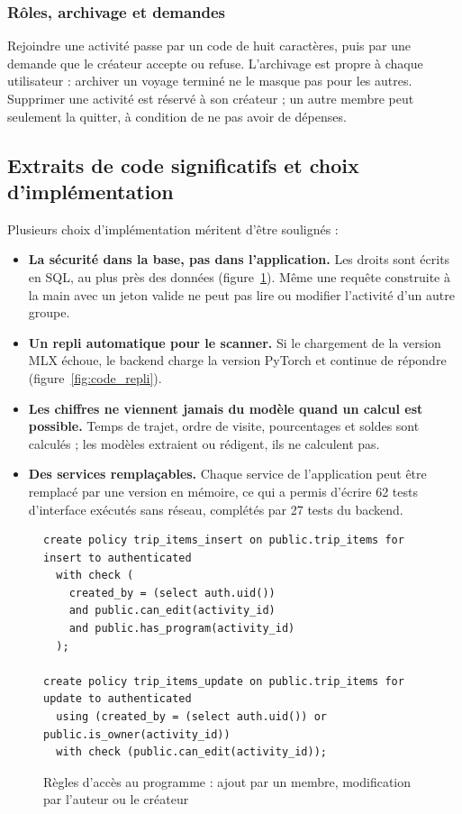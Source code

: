 \subsubsection{Rôles, archivage et demandes}

Rejoindre une activité passe par un code de huit caractères, puis par une demande que le
créateur accepte ou refuse. L'archivage est propre à chaque utilisateur : archiver un voyage
terminé ne le masque pas pour les autres. Supprimer une activité est réservé à son créateur ;
un autre membre peut seulement la quitter, à condition de ne pas avoir de dépenses.

\subsection{Extraits de code significatifs et choix d'implémentation}

Plusieurs choix d'implémentation méritent d'être soulignés :

\begin{itemize}
  \item \textbf{La sécurité dans la base, pas dans l'application.} Les droits sont écrits en
        SQL, au plus près des données (figure~\ref{fig:code_rls}). Même une requête construite
        à la main avec un jeton valide ne peut pas lire ou modifier l'activité d'un autre
        groupe.
  \item \textbf{Un repli automatique pour le scanner.} Si le chargement de la version MLX
        échoue, le backend charge la version PyTorch et continue de répondre
        (figure~\ref{fig:code_repli}).
  \item \textbf{Les chiffres ne viennent jamais du modèle quand un calcul est possible.}
        Temps de trajet, ordre de visite, pourcentages et soldes sont calculés ; les modèles
        extraient ou rédigent, ils ne calculent pas.
  \item \textbf{Des services remplaçables.} Chaque service de l'application peut être
        remplacé par une version en mémoire, ce qui a permis d'écrire 62 tests d'interface
        exécutés sans réseau, complétés par 27 tests du backend.
\end{itemize}

\begin{figure}[H]
\begin{lstlisting}[language=SQL2]
create policy trip_items_insert on public.trip_items for insert to authenticated
  with check (
    created_by = (select auth.uid())
    and public.can_edit(activity_id)
    and public.has_program(activity_id)
  );

create policy trip_items_update on public.trip_items for update to authenticated
  using (created_by = (select auth.uid()) or public.is_owner(activity_id))
  with check (public.can_edit(activity_id));
\end{lstlisting}
\caption{Règles d'accès au programme : ajout par un membre, modification par l'auteur ou le créateur}
\label{fig:code_rls}
\end{figure}

